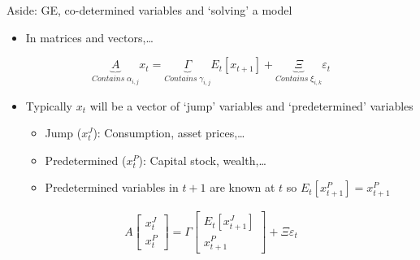 \begin{frame}{Aside: GE, co-determined variables and `solving' a model}

\begin{itemize}
\item	In matrices and vectors,\ldots
\end{itemize}
\begin{equation*}
\underbrace{A}_{Contains\; \alpha_{i,j}} x_{t} = \underbrace{\Gamma}_{Contains\; \gamma_{i,j}} E_{t}[ x_{t+1} ] + \underbrace{\Xi}_{Contains\; \xi_{i,k}} \varepsilon_{t}
\end{equation*}
\begin{itemize}
\item	Typically $x_{t}$ will be a vector of `jump' variables and `predetermined' variables
	\begin{itemize}
	\item	Jump ($x^{J}_{t}$): Consumption, asset prices,\ldots
	\item	Predetermined ($x^{P}_{t}$): Capital stock, wealth,\ldots
	\item	Predetermined variables in $t+1$ are known at $t$ so $E_{t}[x^{P}_{t+1}]=x^{P}_{t+1}$
	\end{itemize}
\end{itemize}
\begin{gather*}
 A \begin{bmatrix} x^{J}_{t} \\ x^{P}_{t} \end{bmatrix}
 =
 \Gamma 
  \begin{bmatrix}
   E_{t}[ x^{J}_{t+1} ] \\ x^{P}_{t+1}
   \end{bmatrix}
 + 
 \Xi \varepsilon_{t}
\end{gather*}

\end{frame}


